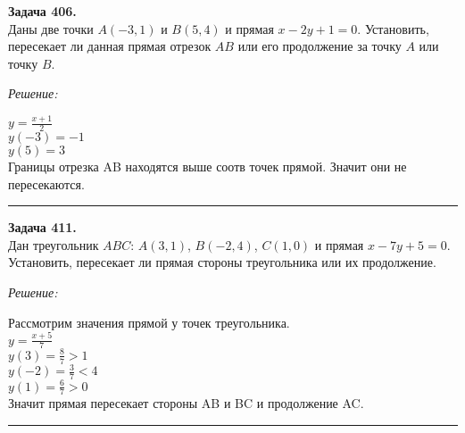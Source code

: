 \documentclass[a4paper, 12pt]{article}
\newenvironment{problem}[2][Задача]
    { \begin{mdframed}[backgroundcolor=gray!10] \textbf{#1 #2.} \\}
    {  \end{mdframed}}
\newenvironment{solution}
    {\textit{Решение: }}
    {\noindent\rule{7in}{1.5pt}}
\begin{document}
\begin{problem}{406}
Даны две точки $A(-3,1)$ и $B(5,4)$ и прямая ${x-2y+1=0}$. Установить, пересекает ли данная прямая отрезок $AB$ или его продолжение за точку $A$ или точку $B$.
\end{problem}
\begin{solution}

$y = \frac{x + 1}{2}$ \\
$y(-3) = -1$ \\
$y(5) = 3$ \\
Границы отрезка AB находятся выше соотв точек прямой. Значит они не пересекаются.

\end{solution}

\begin{problem}{411}
Дан треугольник $ABC$: $A(3,1)$, $B(-2,4)$, $C(1,0)$ и прямая ${x-7y+5=0}$. Установить, пересекает ли прямая стороны треугольника или их продолжение.
\end{problem}
\begin{solution}

Рассмотрим значения прямой у точек треугольника. \\
$y = \frac{x + 5}{7}$ \\
$y(3) = \frac{8}{7} > 1$ \\
$y(-2) = \frac{3}{7} < 4$ \\
$y(1) = \frac{6}{7} > 0$ \\
Значит прямая пересекает стороны AB и BC и продолжение AC.

\end{solution}
\end{document}
